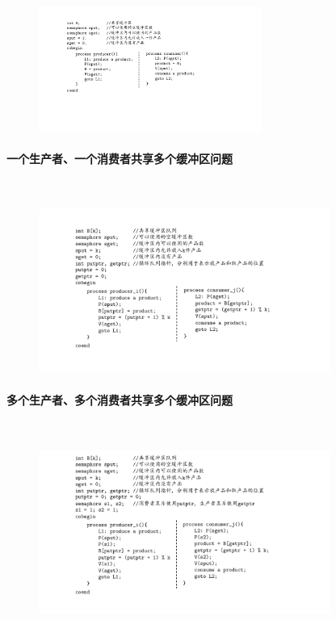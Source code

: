 \documentclass[cs4size,a4paper,10pt]{ctexart}
\begin{document}
	\begin{figure}[H]
		\centering
		\includegraphics[width=0.65\textwidth]{img/一个生产者、一个消费者共享一个缓冲区问题.pdf}
	\end{figure}

	\paragraph{一个生产者、一个消费者共享多个缓冲区问题}~{}

	\begin{figure}[H]
		\centering
		\includegraphics[width=0.85\textwidth]{img/一个生产者、一个消费者共享多个缓冲区问题.pdf}
	\end{figure}

	\paragraph{多个生产者、多个消费者共享多个缓冲区问题}~{}

	\begin{figure}[H]
		\centering
		\includegraphics[width=0.85\textwidth]{img/多个生产者、多个消费者共享多个缓冲区问题.pdf}
	\end{figure}
\end{document}
